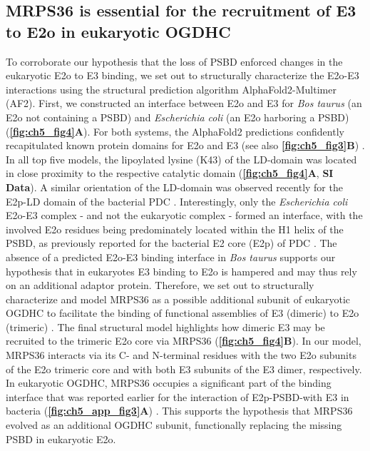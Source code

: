 \subsection*{MRPS36 is essential for the recruitment of E3 to E2o in eukaryotic OGDHC}
To corroborate our hypothesis that the loss of PSBD enforced changes in the eukaryotic E2o to E3 binding, we set out to structurally characterize the E2o-E3 interactions using the structural prediction algorithm AlphaFold2-Multimer \cite{Evans_2022} (AF2). First, we constructed an interface between E2o and E3 for \emph{Bos taurus} (an E2o not containing a PSBD) and \emph{Escherichia coli} (an E2o harboring a PSBD) (\textbf{\autoref{fig:ch5_fig4}A}). For both systems, the AlphaFold2 predictions confidently recapitulated known protein domains for E2o and E3 (see also \textbf{\autoref{fig:ch5_fig3}B}) \cite{Brautigam_2005, Nagy_2021}. In all top five models, the lipoylated lysine (K43) of the LD-domain was located in close proximity to the respective catalytic domain (\textbf{\autoref{fig:ch5_fig4}A}, \textbf{SI Data}). A similar orientation of the LD-domain was observed recently for the E2p-LD domain of the bacterial PDC \cite{Skerlova_2021}. Interestingly, only the \emph{Escherichia coli} E2o-E3 complex - and not the eukaryotic complex - formed an interface, with the involved E2o residues being predominately located within the H1 helix of the PSBD, as previously reported for the bacterial E2 core (E2p) of PDC \cite{Mande_1996}. The absence of a predicted E2o-E3 binding interface in \emph{Bos taurus} supports our hypothesis that in eukaryotes E3 binding to E2o is hampered and may thus rely on an additional adaptor protein. Therefore, we set out to structurally characterize and model MRPS36 as a possible additional subunit of eukaryotic OGDHC to facilitate the binding of functional assemblies of E3 (dimeric) to E2o (trimeric) \cite{Liu_2022, Murphy_2005, Nagy_2021}. The final structural model highlights how dimeric E3 may be recruited to the trimeric E2o core via MRPS36 (\textbf{\autoref{fig:ch5_fig4}B}). In our model, MRPS36 interacts via its C- and N-terminal residues with the two E2o subunits of the E2o trimeric core and with both E3 subunits of the E3 dimer, respectively. In eukaryotic OGDHC, MRPS36 occupies a significant part of the binding interface that was reported earlier for the interaction of E2p-PSBD-with E3 in bacteria (\textbf{\autoref{fig:ch5_app_fig3}A}) \cite{Mande_1996}. This supports the hypothesis that MRPS36 evolved as an additional OGDHC subunit, functionally replacing the missing PSBD in eukaryotic E2o.

